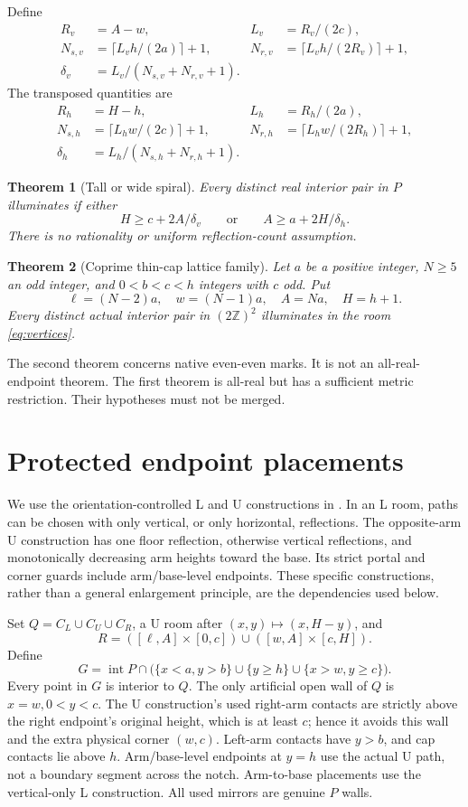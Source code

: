 \documentclass[11pt]{article}
\newtheorem{theorem}{Theorem}[section]
\theoremstyle{definition}
\newcommand{\Z}{\mathbb Z}
\newcommand{\intr}{\operatorname{int}}
\begin{document}
Define
\begin{align*}
 R_v&=A-w,& L_v&=R_v/(2c),\\
 N_{s,v}&=\lceil L_vh/(2a)\rceil+1,&
 N_{r,v}&=\lceil L_vh/(2R_v)\rceil+1,\\
 \delta_v&=L_v/(N_{s,v}+N_{r,v}+1).
\end{align*}
The transposed quantities are
\begin{align*}
 R_h&=H-h,& L_h&=R_h/(2a),\\
 N_{s,h}&=\lceil L_hw/(2c)\rceil+1,&
 N_{r,h}&=\lceil L_hw/(2R_h)\rceil+1,\\
 \delta_h&=L_h/(N_{s,h}+N_{r,h}+1).
\end{align*}

\begin{theorem}[Tall or wide spiral]\label{thm:tall}
Every distinct real interior pair in $P$ illuminates if either
\[
 H\ge c+2A/\delta_v\qquad\text{or}\qquad A\ge a+2H/\delta_h.
\]
There is no rationality or uniform reflection-count assumption.
\end{theorem}

\begin{theorem}[Coprime thin-cap lattice family]\label{thm:coprime}
Let $a$ be a positive integer, $N\ge5$ an odd integer, and $0<b<c<h$ integers with $c$ odd. Put
\[
 \ell=(N-2)a,\quad w=(N-1)a,\quad A=Na,\quad H=h+1.
\]
Every distinct actual interior pair in $(2\Z)^2$ illuminates in the room \eqref{eq:vertices}.
\end{theorem}

The second theorem concerns native even-even marks. It is not an all-real-endpoint theorem. The first theorem is all-real but has a sufficient metric restriction. Their hypotheses must not be merged.

\section{Protected endpoint placements}
We use the orientation-controlled L and U constructions in \cite{eightwall}. In an L room, paths can be chosen with only vertical, or only horizontal, reflections. The opposite-arm U construction has one floor reflection, otherwise vertical reflections, and monotonically decreasing arm heights toward the base. Its strict portal and corner guards include arm/base-level endpoints. These specific constructions, rather than a general enlargement principle, are the dependencies used below.

Set $Q=C_L\cup C_U\cup C_R$, a U room after $(x,y)\mapsto(x,H-y)$, and
\[
 R=([\ell,A]\times[0,c])\cup([w,A]\times[c,H]).
\]
Define
\[
 G=\intr P\cap\bigl(\{x<a,y>b\}\cup\{y\ge h\}\cup\{x>w,y\ge c\}\bigr).
\]
Every point in $G$ is interior to $Q$. The only artificial open wall of $Q$ is $x=w,0<y<c$. The U construction's used right-arm contacts are strictly above the right endpoint's original height, which is at least $c$; hence it avoids this wall and the extra physical corner $(w,c)$. Left-arm contacts have $y>b$, and cap contacts lie above $h$. Arm/base-level endpoints at $y=h$ use the actual U path, not a boundary segment across the notch. Arm-to-base placements use the vertical-only L construction. All used mirrors are genuine $P$ walls.
\end{document}
